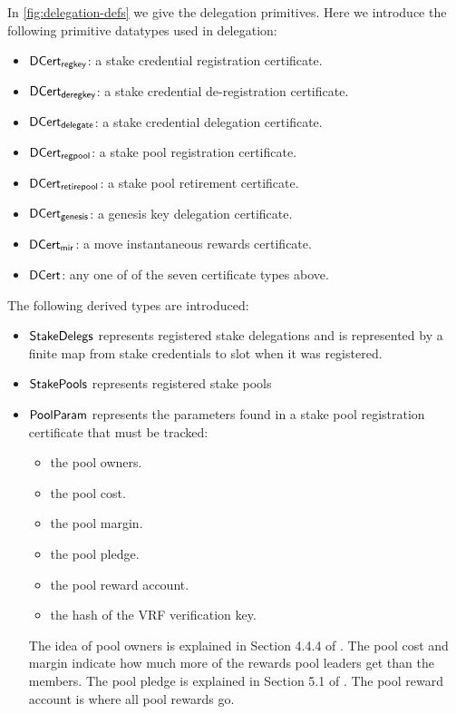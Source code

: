 In \cref{fig:delegation-defs} we give the delegation primitives.
Here we introduce the following primitive datatypes used in delegation:

\begin{itemize}
\item $\mathsf{DCert_{regkey}}$: a stake credential registration certificate.
\item $\mathsf{DCert_{deregkey}}$: a stake credential de-registration certificate.
\item $\mathsf{DCert_{delegate}}$: a stake credential delegation certificate.
\item $\mathsf{DCert_{regpool}}$: a stake pool registration certificate.
\item $\mathsf{DCert_{retirepool}}$: a stake pool retirement certificate.
\item $\mathsf{DCert_{genesis}}$: a genesis key delegation certificate.
\item $\mathsf{DCert_{mir}}$: a move instantaneous rewards certificate.
\item $\mathsf{DCert}$: any one of of the seven certificate types above.
\end{itemize}
The following derived types are introduced:
\begin{itemize}
\item $\mathsf{StakeDelegs}$ represents registered stake delegations and is
  represented by a finite map from stake credentials to slot when it was
  registered.
\item$\mathsf{StakePools}$ represents registered stake pools
\item $\mathsf{PoolParam}$ represents the parameters found in a stake pool registration certificate
  that must be tracked:
  \begin{itemize}
    \item the pool owners.
    \item the pool cost.
    \item the pool margin.
    \item the pool pledge.
    \item the pool reward account.
    \item the hash of the VRF verification key.
  \end{itemize}
  The idea of pool owners is explained in Section 4.4.4 of \cite{delegation_design}.
  The pool cost and margin indicate how much more of the rewards pool leaders
  get than the members.
  The pool pledge is explained in Section 5.1 of \cite{delegation_design}.
  The pool reward account is where all pool rewards go.
\end{itemize}

